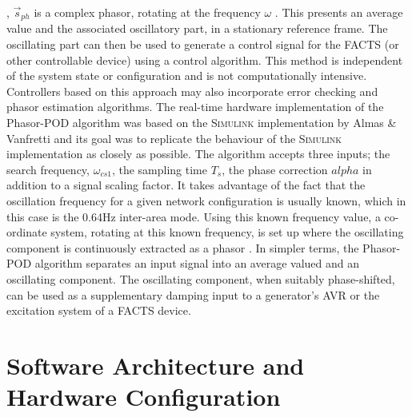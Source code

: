 \documentclass[journal]{IEEEtran}
\begin{document}
, $\stackrel{\to }{s}_{ph}$ is a complex phasor, rotating at the frequency $\omega$ \cite{PhasorPOD}. This presents an average value and the associated oscillatory part, in a stationary reference frame. The oscillating part can then be used to generate a control signal for the FACTS (or other controllable device) using a control algorithm. This method is independent of the system state or configuration and is not computationally intensive. Controllers based on this approach may also incorporate error checking and phasor estimation algorithms. The real-time hardware implementation of the Phasor-POD algorithm was based on the \textsc{Simulink} implementation by Almas \& Vanfretti \cite{PhasorPODImplement} and its goal was to replicate the behaviour of the \textsc{Simulink} implementation as closely as possible. The algorithm accepts three inputs; the search frequency, $\omega_{cs1}$, the sampling time $T_{s}$, the phase correction $alpha$ in addition to a signal scaling factor. It takes advantage of the fact that the oscillation frequency for a given network configuration is usually known, which in this case is the 0.64Hz inter-area mode. Using this known frequency value, a  co-ordinate system, rotating at this known frequency, is set up where the oscillating component is continuously extracted as a phasor \cite{PhasorPOD}. In simpler terms, the Phasor-POD algorithm separates an input signal into an average valued and an oscillating component. The oscillating component, when suitably phase-shifted, can be used as a supplementary damping input to a generator's AVR or the excitation system of a FACTS device.
\section{Software Architecture and Hardware Configuration}\label{softhardware}
\end{document}
